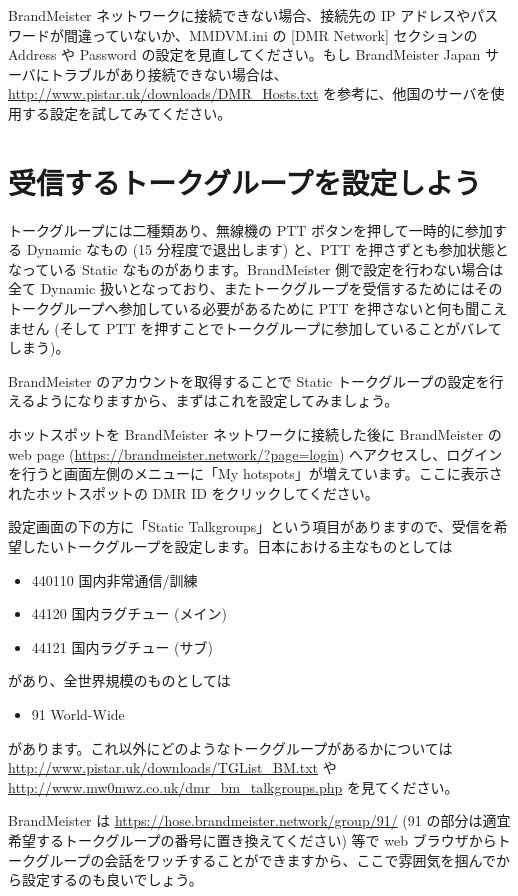 \documentclass[a4j,oneside]{ujbook}
\begin{document}
BrandMeister ネットワークに接続できない場合、接続先の IP アドレスやパスワードが間違っていないか、MMDVM.ini の [DMR Network] セクションの Address や Password の設定を見直してください。もし BrandMeister Japan サーバにトラブルがあり接続できない場合は、\url{http://www.pistar.uk/downloads/DMR_Hosts.txt} を参考に、他国のサーバを使用する設定を試してみてください。

\section{受信するトークグループを設定しよう}

トークグループには二種類あり、無線機の PTT ボタンを押して一時的に参加する Dynamic なもの (15 分程度で退出します) と、PTT を押さずとも参加状態となっている Static なものがあります。BrandMeister 側で設定を行わない場合は全て Dynamic 扱いとなっており、またトークグループを受信するためにはそのトークグループへ参加している必要があるために PTT を押さないと何も聞こえません (そして PTT を押すことでトークグループに参加していることがバレてしまう)。

BrandMeister のアカウントを取得することで Static トークグループの設定を行えるようになりますから、まずはこれを設定してみましょう。

ホットスポットを BrandMeister ネットワークに接続した後に BrandMeister の web page (\url{https://brandmeister.network/?page=login}) へアクセスし、ログインを行うと画面左側のメニューに「My hotspots」が増えています。ここに表示されたホットスポットの DMR ID をクリックしてください。

設定画面の下の方に「Static Talkgroups」という項目がありますので、受信を希望したいトークグループを設定します。日本における主なものとしては
\begin{itemize}
 \item 440110 国内非常通信/訓練
 \item 44120 国内ラグチュー (メイン)
 \item 44121 国内ラグチュー (サブ)
\end{itemize}
があり、全世界規模のものとしては
\begin{itemize}
 \item 91 World-Wide
\end{itemize}
があります。これ以外にどのようなトークグループがあるかについては \url{http://www.pistar.uk/downloads/TGList_BM.txt} や \url{http://www.mw0mwz.co.uk/dmr_bm_talkgroups.php} を見てください。

BrandMeister は \url{https://hose.brandmeister.network/group/91/} (91 の部分は適宜希望するトークグループの番号に置き換えてください) 等で web ブラウザからトークグループの会話をワッチすることができますから、ここで雰囲気を掴んでから設定するのも良いでしょう。
\end{document}
